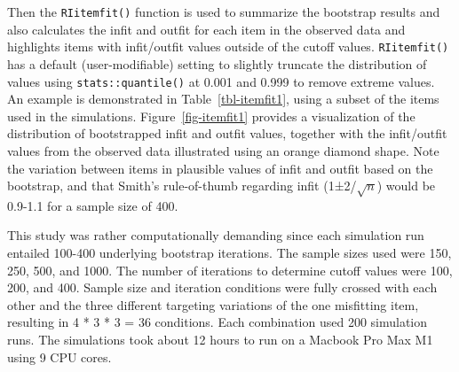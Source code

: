 \documentclass[
  letterpaper,
  DIV=11,
  numbers=noendperiod]{scrartcl}
\begin{document}
Then the \texttt{RIitemfit()} function is used to summarize the
bootstrap results and also calculates the infit and outfit for each item
in the observed data and highlights items with infit/outfit values
outside of the cutoff values. \texttt{RIitemfit()} has a default
(user-modifiable) setting to slightly truncate the distribution of
values using \texttt{stats::quantile()} at 0.001 and 0.999 to remove
extreme values. An example is demonstrated in Table~\ref{tbl-itemfit1},
using a subset of the items used in the simulations.
Figure~\ref{fig-itemfit1} provides a visualization of the distribution
of bootstrapped infit and outfit values, together with the infit/outfit
values from the observed data illustrated using an orange diamond shape.
Note the variation between items in plausible values of infit and outfit
based on the bootstrap, and that Smith's rule-of-thumb regarding infit
(1±2/\(\sqrt{n}\)) would be 0.9-1.1 for a sample size of 400.

This study was rather computationally demanding since each simulation
run entailed 100-400 underlying bootstrap iterations. The sample sizes
used were 150, 250, 500, and 1000. The number of iterations to determine
cutoff values were 100, 200, and 400. Sample size and iteration
conditions were fully crossed with each other and the three different
targeting variations of the one misfitting item, resulting in 4 * 3 * 3
= 36 conditions. Each combination used 200 simulation runs. The
simulations took about 12 hours to run on a Macbook Pro Max M1 using 9
CPU cores.
\end{document}
